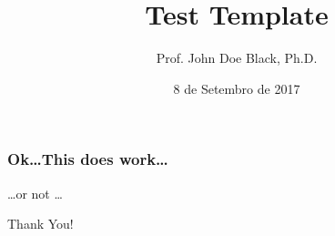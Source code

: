 \documentclass[aspectratio=169,14pt,usenames,dvipsnames]{beamer}
\title{Test Template}
\author{Prof. John Doe Black, Ph.D.}
\institute{The Greatest Institute Ever Made}
\date{8 de Setembro de 2017}
\begin{document}
\begin{frame}
    \titlepage
\end{frame}

\begin{frame}
    \frametitle{Ok\ldots This does work\ldots}

    \Huge \ldots or not \ldots
\end{frame}

\begin{frame}
    \Huge Thank You!
\end{frame}
\end{document}
